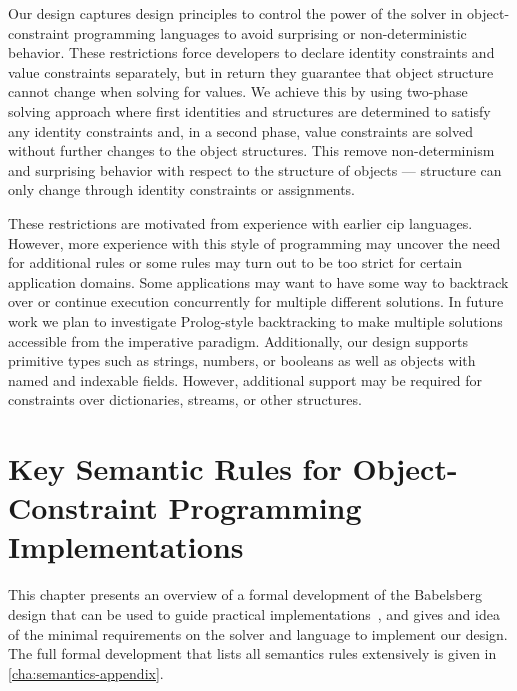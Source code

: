 \SummarySep
Our design captures design principles to control the power of the solver in
object-constraint programming languages to avoid surprising or non-deterministic
behavior. These restrictions force developers to declare identity constraints
and value constraints separately, but in return they guarantee that object
structure cannot change when solving for values. We achieve this by using
two-phase solving approach where first identities and structures are determined
to satisfy any identity constraints and, in a second phase, value constraints
are solved without further changes to the object structures. This remove
non-determinism and surprising behavior with respect to the structure of objects
--- structure can only change through identity constraints or assignments.

These restrictions are motivated from experience with earlier \acrlong{cip}
languages. However, more experience with this style of programming may uncover
the need for additional rules or some rules may turn out to be too strict for
certain application domains. Some applications may want to have some way to
backtrack over or continue execution concurrently for multiple different
solutions. In future work we plan to investigate Prolog-style backtracking to
make multiple solutions accessible from the imperative paradigm. Additionally,
our design supports primitive types such as strings, numbers, or booleans as
well as objects with named and indexable fields. However, additional support may
be required for constraints over dictionaries, streams, or other structures.


\chapter{Key Semantic Rules for Object-Constraint Programming Implementations}
\label{sec:semantics}

This chapter presents an overview of a formal development of the Babelsberg
design that can be used to guide practical
implementations~\cite{FelgentreffOOPSLA2015}, and gives and idea of the minimal
requirements on the solver and language to implement our design. The full formal
development that lists all semantics rules extensively is given in
\autoref{cha:semantics-appendix}.

